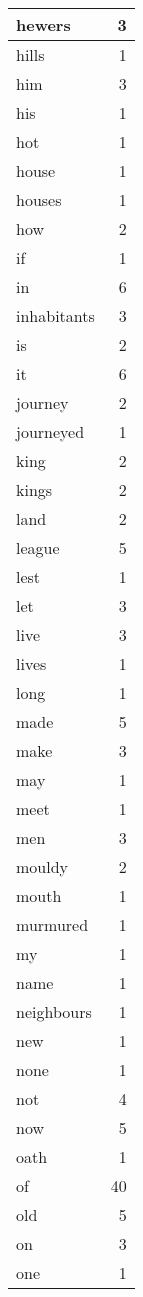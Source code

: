 \begin{center}
\begin{longtable}{l|r}
hewers & 3\\ \hline 
hills & 1\\ \hline 
him & 3\\ \hline 
his & 1\\ \hline 
hot & 1\\ \hline 
house & 1\\ \hline 
houses & 1\\ \hline 
how & 2\\ \hline 
if & 1\\ \hline 
in & 6\\ \hline 
inhabitants & 3\\ \hline 
is & 2\\ \hline 
it & 6\\ \hline 
journey & 2\\ \hline 
journeyed & 1\\ \hline 
king & 2\\ \hline 
kings & 2\\ \hline 
land & 2\\ \hline 
league & 5\\ \hline 
lest & 1\\ \hline 
let & 3\\ \hline 
live & 3\\ \hline 
lives & 1\\ \hline 
long & 1\\ \hline 
made & 5\\ \hline 
make & 3\\ \hline 
may & 1\\ \hline 
meet & 1\\ \hline 
men & 3\\ \hline 
mouldy & 2\\ \hline 
mouth & 1\\ \hline 
murmured & 1\\ \hline 
my & 1\\ \hline 
name & 1\\ \hline 
neighbours & 1\\ \hline 
new & 1\\ \hline 
none & 1\\ \hline 
not & 4\\ \hline 
now & 5\\ \hline 
oath & 1\\ \hline 
of & 40\\ \hline 
old & 5\\ \hline 
on & 3\\ \hline 
one & 1\\ \hline 

\end{longtable}
\end{center}
